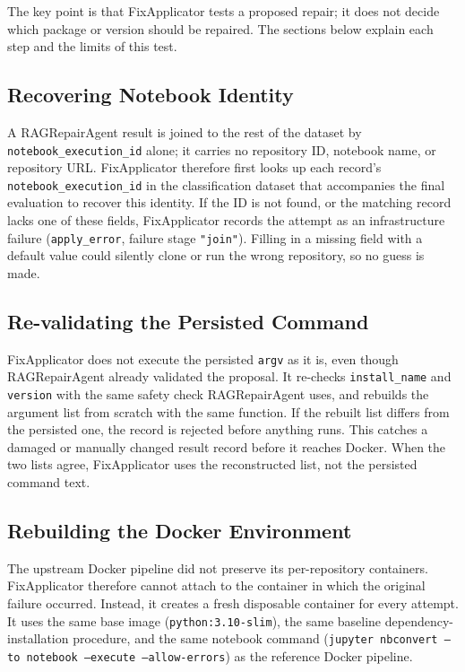 The key point is that FixApplicator tests a proposed repair; it does not decide
which package or version should be repaired. The sections below explain each
step and the limits of this test.

\subsection{Recovering Notebook Identity}

\begin{sloppypar}
A RAGRepairAgent result is joined to the rest of the dataset by
\texttt{notebook\_execution\_id} alone; it carries no repository ID,
notebook name, or repository URL. FixApplicator therefore first looks up
each record's \texttt{notebook\_execution\_id} in the classification
dataset that accompanies the final evaluation
to recover this identity. If the ID is not found, or the matching record
lacks one of these fields, FixApplicator records the attempt as an
infrastructure failure (\texttt{apply\_error}, failure stage
\texttt{"join"}). Filling in a missing field with a default value could
silently clone or run the wrong repository, so no guess is made.
\end{sloppypar}

\subsection{Re-validating the Persisted Command}

FixApplicator does not execute the persisted \texttt{argv} as it is, even
though RAGRepairAgent already validated the proposal. It re-checks
\texttt{install\_name} and \texttt{version} with the same safety check
RAGRepairAgent uses, and rebuilds the argument list from scratch with the
same function. If the rebuilt list differs from the persisted one, the
record is rejected before anything runs. This catches a damaged or manually
changed result record before it reaches Docker. When the two lists agree,
FixApplicator uses the reconstructed list, not the persisted command text.

\subsection{Rebuilding the Docker Environment}
\label{sec:m-fixapply-docker}

The upstream Docker pipeline did not preserve its per-repository containers.
FixApplicator therefore cannot attach to the container in which the original
failure occurred. Instead, it creates a fresh disposable container for every
attempt. It uses the same base image (\texttt{python:3.10-slim}), the same
baseline dependency-installation procedure, and the same notebook command
(\texttt{jupyter nbconvert --to notebook --execute --allow-errors}) as the
reference Docker pipeline.

